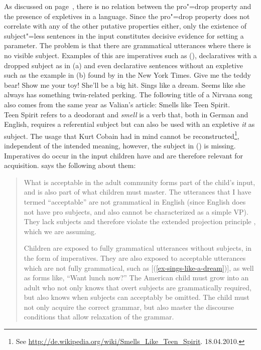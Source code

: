 As discussed on page~\pageref{fn-Expletiva-Pro-Drop}, there is no relation between the pro"=drop property and the presence of expletives
in a language. Since the pro"=drop property does not correlate with any of the other putative properties either, only the existence
of subject"=less sentences in the input constitutes decisive evidence for setting a parameter. The problem is that there are grammatical utterances
where there is no visible subject. Examples of this are imperatives such as (), declaratives
with a dropped subject as in (a) and even declarative sentences without an expletive such as the  
example in (b) found by \citet[]{Valian91a} in the New York Times.
\eal
\label{Beispiel-Imperativ-Englisch}
\ex Give me the teddy bear!
\ex Show me your toy!
\zl
\eal
\ex She'll be a big hit. Sings like a dream.\label{ex-sings-like-a-dream}
\ex Seems like she always has something twin-related perking.
\zl
The following title of a Nirvana song also comes from the same year as Valian's article:
\ea
Smells like Teen Spirit.\\
\z
Teen Spirit refers to a deodorant and \emph{smell} is a verb that, both in German and English, requires a referential subject but can also be used with an expletive \emph{it} as subject.
The usage that Kurt Cobain had in mind cannot be reconstructed\footnote{
  See \url{http://de.wikipedia.org/wiki/Smells_Like_Teen_Spirit}. 18.04.2010.
}, independent of the intended meaning, however, the subject in () is missing.
Imperatives do occur in the input children have and are therefore relevant for acquisition.
\citet[]{Valian91a} says the following about them:
\begin{quote}
What is acceptable in the adult community forms part of the child's input, and
is also part of what children must master. The utterances that I have termed
``acceptable'' are not grammatical in English (since English does not have pro
subjects, and also cannot be characterized as a simple VP). They lack subjects
and therefore violate the extended projection principle \citep{Chomsky81a}, which we are assuming.

   Children are exposed to fully grammatical utterances without subjects, in the
form of imperatives. They are also exposed to acceptable utterances which are
not fully grammatical, such as [(\ref{ex-sings-like-a-dream})], as well as forms like, ``Want lunch now?'' The
American child must grow into an adult who not only knows that overt subjects
are grammatically required, but also knows when subjects can acceptably be
omitted. The child must not only acquire the correct grammar, but also master
the discourse conditions that allow relaxation of the grammar. \citep[]{Valian91a}
\end{quote}

